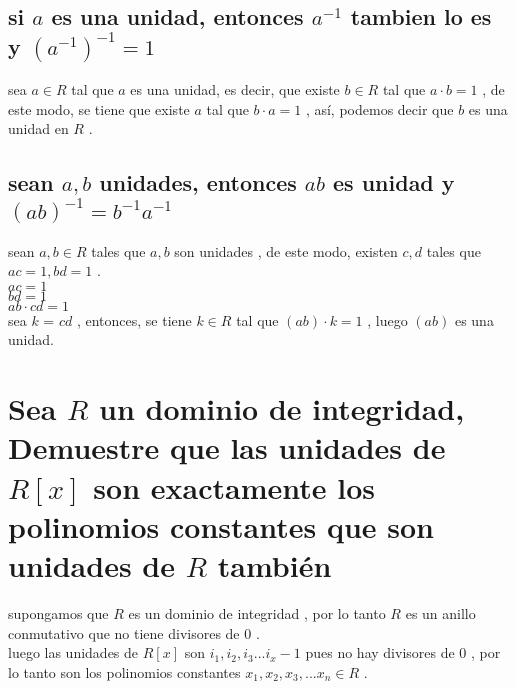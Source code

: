 \documentclass[10pt,a4paper]{article} %
\begin{document}
        \subsection{si $ a  $ es una unidad, entonces $ a ^{-1}   $ tambien lo
        es y $ (a ^{-1})^{-1}    = 1  $ }

            sea $ a \in R  $ tal que $ a  $ es una unidad, es decir, que existe
            $ b \in  R  $ tal que $ a \cdot  b = 1  $ , de este modo, se tiene
            que  existe $ a  $ tal que $ b \cdot a = 1  $ , así, podemos decir
            que $ b  $ es una unidad en $ R  $ .

        \subsection{sean $ a,b  $ unidades, entonces $ ab  $ es unidad y $
        (ab)^{-1} = b ^{-1} a ^{-1}   $ }
            sean $ a,b \in R  $ tales que $ a,b  $ son unidades , de este modo,
            existen $ c,d  $ tales que $ ac = 1 , bd = 1  $ .
            \\
            $ ac = 1  $
            \\
            $ bd = 1  $
            \\
            $ ab \cdot cd = 1  $
            \\
            sea $ k  $  = $ cd  $ , entonces, se tiene $ k \in R  $ tal que $
            (ab)\cdot k = 1  $ , luego $ (ab)  $ es una unidad.


        \section{Sea $ R  $ un dominio de integridad, Demuestre que las
        unidades de $ R[x]  $  son exactamente los polinomios constantes
        que son unidades de $ R  $ también}

            supongamos que $ R  $ es un dominio de integridad , por lo tanto $
            R  $ es un anillo conmutativo que no tiene divisores de $ 0  $ .
            \\
            luego las unidades de $ R[x]  $ son $ i_1 , i_2 , i_3 ... i_x-1  $
            pues no hay divisores de $ 0  $ , por lo tanto son los polinomios
            constantes $ x_1 , x_2 , x_3 , ... x_n \in R  $  .
\end{document}
